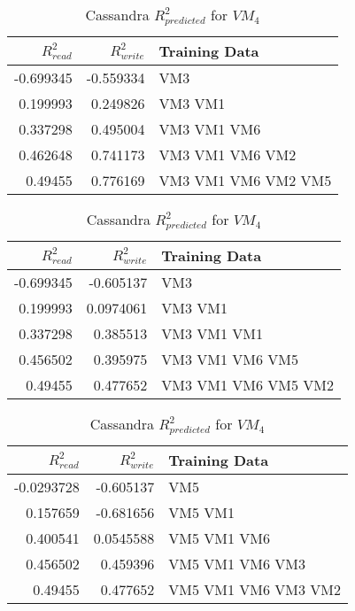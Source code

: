\begin{table}
\centering
\caption{Cassandra $R_{predicted}^2$ for $VM_4$}
\begin{tabular}{|r|r|l|} \hline
$R_{read}^2$&$R_{write}^2$&Training Data\\ \hline
-0.699345 & -0.559334  & VM3 \\ \hline 
0.199993 & 0.249826  & VM3 VM1 \\ \hline 
0.337298 &  0.495004 & VM3 VM1 VM6 \\ \hline 
0.462648 & 0.741173  & VM3 VM1 VM6 VM2 \\ \hline 
0.49455 & 0.776169  & VM3 VM1 VM6 VM2 VM5 \\ \hline 
\hline\end{tabular}
\label{table:cassandra1}

\centering
\caption{Cassandra $R_{predicted}^2$ for $VM_4$}
\begin{tabular}{|r|r|l|} \hline
$R_{read}^2$&$R_{write}^2$&Training Data\\ \hline
-0.699345 & -0.605137  & VM3 \\ \hline 
0.199993 &  0.0974061 & VM3 VM1 \\ \hline 
0.337298 &  0.385513 & VM3 VM1 VM1 \\ \hline 
0.456502 & 0.395975  & VM3 VM1 VM6 VM5 \\ \hline 
0.49455 & 0.477652  & VM3 VM1 VM6 VM5 VM2 \\ \hline 
\hline\end{tabular}
\label{table:cassandra2}

\centering
\caption{Cassandra $R_{predicted}^2$ for $VM_4$}
\begin{tabular}{|r|r|l|} \hline
$R_{read}^2$&$R_{write}^2$&Training Data\\ \hline
-0.0293728 & -0.605137  & VM5 \\ \hline 
0.157659 &  -0.681656 & VM5 VM1 \\ \hline 
0.400541 & 0.0545588  & VM5 VM1 VM6 \\ \hline 
0.456502 & 0.459396  & VM5 VM1 VM6 VM3 \\ \hline 
0.49455 & 0.477652  & VM5 VM1 VM6 VM3 VM2 \\ \hline 
\hline\end{tabular}
\label{table:cassandra3}


\end{table}
